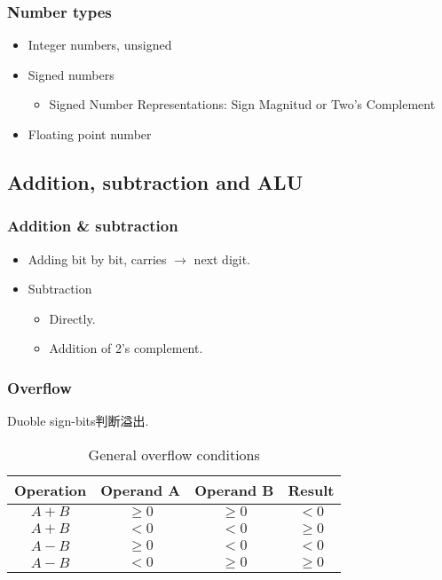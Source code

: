 \subsubsection{Number types}
\begin{itemize}
    \item  Integer numbers, unsigned
    \item Signed numbers
    \begin{itemize}
        \item Signed Number Representations: Sign Magnitud or Two's Complement
    \end{itemize}
    \item Floating point number
\end{itemize}

\subsection{Addition, subtraction and ALU}
\subsubsection{Addition \& subtraction}
\begin{itemize}
    \item Adding bit by bit, carries $\rightarrow$ next digit.
    \item Subtraction
    \begin{itemize}
        \item Directly.
        \item Addition of 2's complement.
    \end{itemize}
\end{itemize}

\subsubsection{Overflow}

Duoble sign-bits判断溢出. 

\begin{table}[H]
    \centering
    \caption{General overflow conditions}
    \begin{tabular}[c]{|c|c|c|c|}\hline
        Operation & Operand A & Operand B & Result\\ \hline
        $A+B$ & $\ge 0$ & $\ge 0$ & $<0$ \\
        $A+B$ & $< 0$ & $< 0$ & $\ge 0$ \\
        $A-B$ & $\ge 0$ & $< 0$ & $<0$ \\
        $A-B$ & $< 0$ & $\ge 0$ & $\ge 0$ \\ \hline
    \end{tabular}
\end{table}

